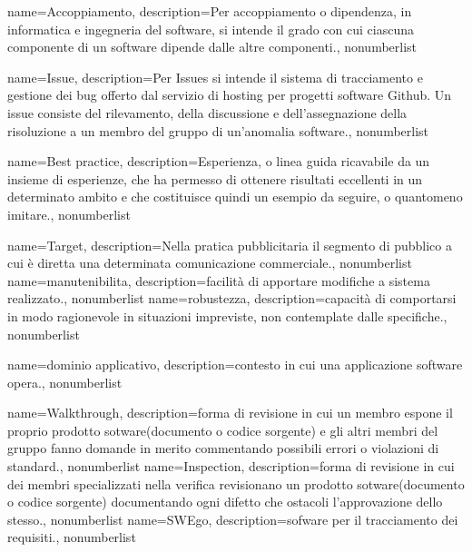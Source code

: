 {
	name={Accoppiamento},
	description={Per accoppiamento o dipendenza, in informatica e ingegneria del software, si intende il grado con cui ciascuna componente di un software dipende dalle altre componenti.}, 
	nonumberlist 
}

{
	name={Issue},
	description={Per Issues si intende il sistema di tracciamento e gestione dei bug offerto dal servizio di hosting per progetti software Github. Un issue consiste del rilevamento, della discussione e dell'assegnazione della risoluzione a un membro del gruppo di un'anomalia software.}, 
	nonumberlist 
}

{
	name={Best practice},
	description={Esperienza, o linea guida ricavabile da un insieme di esperienze, che ha permesso di ottenere risultati eccellenti in un determinato ambito e che costituisce quindi un esempio da seguire, o quantomeno imitare.}, 
	nonumberlist 
}

{
	name={Target},
	description={Nella pratica pubblicitaria il segmento di pubblico a cui è diretta una determinata comunicazione commerciale.}, 
	nonumberlist 
}
{
	name={manutenibilita},
	description={facilità di apportare modifiche a sistema realizzato.}, 
	nonumberlist 
}
{
	name={robustezza},
	description={capacità di comportarsi in modo ragionevole in situazioni impreviste, non contemplate dalle specifiche.}, 
	nonumberlist 
}


{
	name={dominio applicativo},
	description={contesto in cui una applicazione software opera.}, 
	nonumberlist 
}

{
	name={Walkthrough},
	description={forma di revisione in cui un membro espone il proprio prodotto sotware(documento o codice sorgente) e gli altri membri del gruppo fanno domande in merito commentando possibili errori o violazioni di standard.}, 
	nonumberlist 
}
{
	name={Inspection},
	description={forma di revisione in cui dei membri specializzati nella verifica revisionano un prodotto sotware(documento o codice sorgente) documentando ogni difetto che ostacoli l'approvazione dello stesso.}, 
	nonumberlist 
}
{
	name={SWEgo},
	description={sofware per il tracciamento dei requisiti.}, 
	nonumberlist 
}